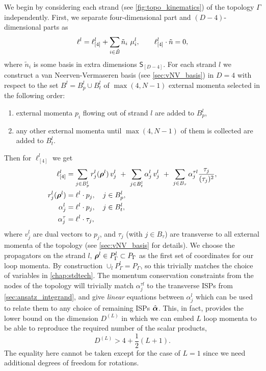 We begin by considering each strand (see \cref{fig:topo_kinematics}) of the topology $\Gamma$ independently.
First, we separate four-dimensional part and $(D-4)$-dimensional parts as
\begin{equation}
  \ell^l = \ell_{[4]}^l + \sum_{i\in \tilde{B}} \tilde{n}_i~\mu^l_{i}, \qquad \sp(\ell^l_{[4]},\tilde{n}) = 0, 
\end{equation}
where $\tilde{n}_i$ is some basis in extra dimensions $\mathsf{S}_{[D-4]}$.
For each strand $l$ we construct a van Neerven-Vermaseren basis (see \cref{sec:vNV_basis})
in $D=4$ with respect to the set $B^l = B^l_p \cup B^l_t$ of $\max(4,N-1)$ external momenta selected in the following order:
\begin{enumerate}
  \item external momenta $p_i$ flowing out of strand $l$ are added to $B^l_p$,
  \item any other external momenta until $\max(4,N-1)$ of them is collected are added to $B^l_t$.
\end{enumerate}
Then for $\ell^l_{[4]}$ we get
\begin{subequations}
  \label{eq:lparametrization}
  \begin{align}
    \ell^l_{[4]} &= \sum_{j\in B^l_p} r^l_j(\vb*{\rho}^l)\,v^l_j ~+~ \sum_{j\in B^l_t} \alpha^l_j\,v^l_j ~+~\sum_{j\in B_\tau} \alpha^{\tau l}_j \frac{\tau_j}{(\tau_j)^2}, \\
    \label{eq:lparametrization_b}
    r_j^l(\vb*{\rho}^l) &=  \sp(\ell^l, p_j), \quad j\in B^l_p,    \\ 
    \label{eq:lparametrization_c}
    \alpha_j^l &=  \sp(\ell^l, p_j),\quad j\in B^l_t, \\
    \label{eq:lparametrization_d}
    \alpha_j^\tau &=  \sp(\ell^l, \tau_j),
  \end{align}
\end{subequations}
where $v^l_j$ are dual vectors to $p_j$, and $\tau_j$ (with $j \in B_{\tau}$) are transverse to all external momenta of the topology (see \cref{sec:vNV_basis} for details).
We choose the propagators on the strand $l$, $\vb*{\rho}^l \in P_\Gamma^l \subset P_\Gamma$
as the first set of coordinates for our loop momenta. By construction $\cup_l P_\Gamma^l = P_\Gamma$,
so this trivially matches the choice of variables in \cref{chap:stdtech}.
The momentum conservation constraints from the nodes of the topology will
trivially match $\alpha_j^{\tau l}$ to the transverse ISPs from \cref{sec:ansatz_integrand},
and give \emph{linear} equations between $\alpha_j^l$ which can be used to
relate them to any choice of remaining ISPs $\hat{\vb*{\alpha}}$.
This, in fact, provides the lower bound on the dimension $D^{(L)}$ in which we can embed $L$ loop momenta
to be able to reproduce the required number of the scalar products,
\begin{equation}
  D^{(L)}  >  4 +\frac{1}{2}(L+1).
\end{equation}
The equality here cannot be taken except for the case of $L=1$ since we need additional degrees of freedom for rotations.

